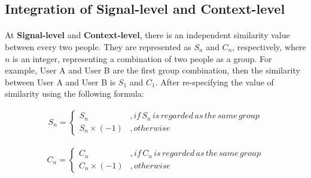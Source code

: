 \documentclass[a4paper,12pt]{report}
\begin{document}
\subsection{Integration of Signal-level and Context-level}
\paragraph{}
At \textbf{Signal-level} and \textbf{Context-level}, there is an independent similarity value between every two people. They are represented as $S_n$ and $C_n$, respectively, where $n$ is an integer, representing a combination of two people as a group. For example, User A and User B are the first group combination, then the similarity between User A and User B is $S_1$ and $C_1$. After re-specifying the value of similarity using the following formula:

\begin{equation*}%
\begin{split}
S_n=\begin{cases}S_n&,if\,S_n\,is\,regarded\,as\,the\,same\,group
 \\
S_n\times(-1)&,otherwise
\end{cases}
\end{split}
\end{equation*}

\begin{equation*}%
\begin{split}
C_n=\begin{cases}C_n&,if\,C_n\,is\,regarded\,as\,the\,same\,group
 \\
C_n\times(-1)&,otherwise
\end{cases}
\end{split}
\end{equation*}
\end{document}
